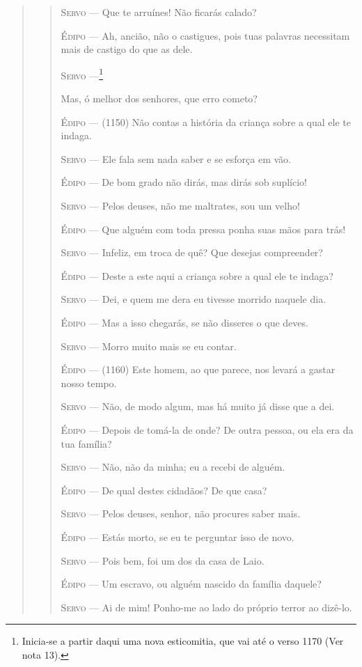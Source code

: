 \begin{verse}
\begin{verse}
\textsc{Servo} --- Que te arruínes! Não ficarás calado?

\textsc{Édipo} --- Ah, ancião, não o castigues, pois tuas palavras necessitam mais de
castigo do que as dele.

\textsc{Servo} ---\footnote{Inicia-se a partir daqui uma nova esticomitia,
  que vai até o verso 1170 (Ver nota 13).}

Mas, ó melhor dos senhores, que erro cometo?

\textsc{Édipo} --- (1150) Não contas a história da criança sobre a qual ele te indaga.

\textsc{Servo} --- Ele fala sem nada saber e se esforça em vão.

\textsc{Édipo} --- De bom grado não dirás, mas dirás sob suplício!

\textsc{Servo} --- Pelos deuses, não me maltrates, sou um velho!

\textsc{Édipo} --- Que alguém com toda pressa ponha suas mãos para trás!

\textsc{Servo} --- Infeliz, em troca de quê? Que desejas compreender?

\textsc{Édipo} --- Deste a este aqui a criança sobre a qual ele te indaga?

\textsc{Servo} --- Dei, e quem me dera eu tivesse morrido naquele dia.

\textsc{Édipo} --- Mas a isso chegarás, se não disseres o que deves.

\textsc{Servo} --- Morro muito mais se eu contar.

\textsc{Édipo} --- (1160) Este homem, ao que parece, nos levará a gastar nosso tempo.

\textsc{Servo} --- Não, de modo algum, mas há muito já disse que a dei.

\textsc{Édipo} --- Depois de tomá-la de onde? De outra pessoa, ou ela era da tua família?

\textsc{Servo} --- Não, não da minha; eu a recebi de alguém.

\textsc{Édipo} --- De qual destes cidadãos? De que casa?

\textsc{Servo} --- Pelos deuses, senhor, não procures saber mais.

\textsc{Édipo} --- Estás morto, se eu te perguntar isso de novo.

\textsc{Servo} --- Pois bem, foi um dos da casa de Laio.

\textsc{Édipo} --- Um escravo, ou alguém nascido da família daquele?

\textsc{Servo} --- Ai de mim! Ponho-me ao lado do próprio terror ao dizê-lo.


\end{verse}
\end{verse}
